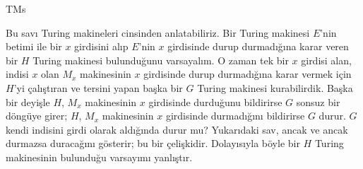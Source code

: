 \documentclass[../../../include/open-logic-section]{subfiles}
\begin{document}
\begin{tagblock}{TMs}
\begin{explain}
Bu savı Turing makineleri cinsinden anlatabiliriz. Bir Turing makinesi $E$'nin
betimi ile bir $x$ girdisini alıp $E$'nin $x$ girdisinde durup durmadığına
karar veren bir $H$ Turing makinesi bulunduğunu varsayalım. O zaman tek bir
$x$ girdisi alan, indisi $x$ olan $M_x$ makinesinin $x$ girdisinde durup
durmadığına karar vermek için $H$'yi çalıştıran ve tersini yapan başka bir
$G$ Turing makinesi kurabilirdik. Başka bir deyişle $H$, $M_x$ makinesinin
$x$ girdisinde durduğunu bildirirse $G$ sonsuz bir döngüye girer; $H$,
$M_x$ makinesinin $x$ girdisinde durmadığını bildirirse $G$ durur. $G$ kendi
indisini girdi olarak aldığında durur mu? Yukarıdaki sav, ancak ve ancak
durmazsa duracağını gösterir; bu bir çelişkidir. Dolayısıyla böyle bir
$H$ Turing makinesinin bulunduğu varsayımı yanlıştır.
\end{explain}
\end{tagblock}
\end{document}
